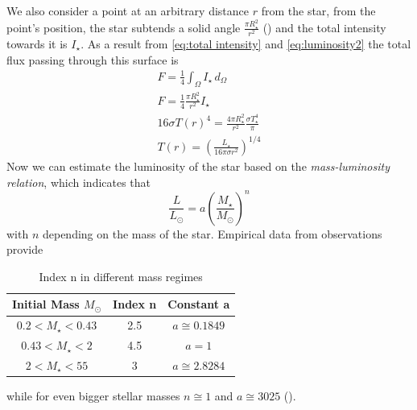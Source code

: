 \documentclass[aps,prb,twocolumn,superscriptaddress,floatfix,longbibliography]{revtex4-2}
\begin{document}
We also consider a point at an arbitrary distance $r$ from the star, from the point's position, the star subtends a solid angle $ \frac{\pi R_{\star}^2}{r^2}$ (\cite{urry1995unified}) and the total intensity towards it is $I_{\star}$. As a result from \eqref{eq:total intensity} and \eqref{eq:luminosity2} the total flux passing through this surface is
\begin{align}
    F = \frac{1}{4} \int_{\Omega}^{} I_{\star} \,d_{\Omega}\ \\
    F = \frac{1}{4} \frac{\pi R_{\star}^2}{r^2} I_{\star}\\
    16\sigma T(r)^4 = \frac{4 \pi R_{\star}^2}{r^2} \frac{\sigma T_{\star}^4}{ \pi} \\
    T(r) = (\frac{L_{\star}}{16 \pi \sigma r^2})^{1/4} \label{eq:temperature-distance}
\end{align}
Now we can estimate the luminosity of the star based on the {\it mass-luminosity relation}, which indicates that
\begin{equation}\label{eq:mass-luminosity relation}
  \frac{L}{L_{\odot}} = a(\frac{M_{\star}}{M_{\odot}})^{n}
\end{equation}
with $n$ depending on the mass of the star. Empirical data from observations provide
\begin{table}[!htbp]
\centering
  \begin{tabular}{ccc}
  \hline
  \textbf{Initial Mass} $M_{\odot}$ & \textbf{Index n} & \textbf{Constant a}\\
  \hline \hline
  $0.2 < M_{\star} < 0.43$ &  2.5 & $a \cong 0.1849$\\
  $0.43 < M_{\star} < 2$ &  4.5 & $a = 1$\\
  $2 < M_{\star} < 55$ &  3 & $a \cong 2.8284$\\
  \hline
  \end{tabular}
 \caption{Index n in different mass regimes}\label{tab:mass-luminosity}
\end{table}

while for even bigger stellar masses $n \cong 1$ and $a \cong 3025$ (\cite{alma991001241309703821}).
\end{document}
